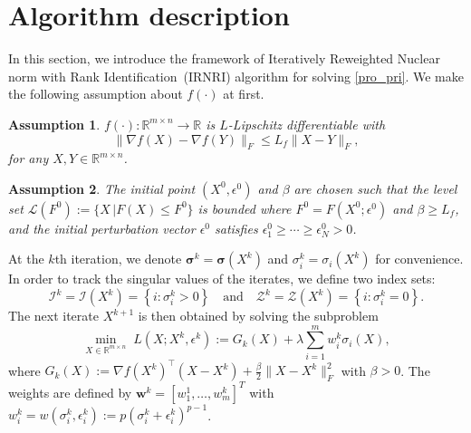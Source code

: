 \documentclass[twoside,11pt]{article}
\newtheorem{ASM}{Assumption}
\numberwithin{equation}{section}
\begin{document}
\section{Algorithm description}
In this section, we introduce the framework of Iteratively Reweighted Nuclear norm with Rank Identification~(IRNRI) algorithm for solving \eqref{pro_pri}. 
We make the following assumption about $f (\cdot)$ at first.
\begin{ASM}\label{ASM_fLip} $f (\cdot):\mathbb{R}^{m\times n}\to\mathbb{R} $ %
  is $L$-Lipschitz differentiable with
  \begin{equation*}
    \|\nabla f (X) - \nabla f (Y)\|_{F} \le L_{f}\|X-Y\|_{F},
  \end{equation*}
  for any $X,Y\in\mathbb{R}^{m\times n}$. %
\end{ASM}
\begin{ASM}\label{ASM_Flower} The initial point $ (X^{0},\epsilon^{0}) $ and $\beta$ are chosen such that the level set $\mathcal{L} (F^{0}):=\{X \,|F (X)\le F^{0} \} $ is bounded where $ F^{0} = F (X^{0};\epsilon^{0})$ and $\beta\ge{L}_{f}$, and the initial perturbation vector  $\epsilon^{0}$ satisfies $\epsilon_{1}^{0} \ge\cdots \ge \epsilon_{N}^{0} > 0$. 
\end{ASM} 

At the $k$th iteration, we denote $\bm{\sigma}^{k} = {\bm \sigma}(X^{k}) $ and $\sigma_i^k = \sigma_i(X^k)$ 
  for convenience.
In order to track the singular values of the iterates, we define two index sets:
\begin{equation*}
  \mathcal{I}^{k} = \mathcal{I} (X^{k}) = \left\{i:\sigma_i^k>0\right\} \quad\text{and}\quad 
  \mathcal{Z}^{k} = \mathcal{Z} (X^{k}) = \left\{i:\sigma_i^k=0\right\}. 
\end{equation*}   
The next iterate $X^{k+1}$ is then obtained by solving the subproblem 
\begin{equation}\label{pro_Linear}
  \min_{X\in\mathbb{R}^{m\times{n}}} \; L(X;X^{k},\epsilon^{k}):= G_{k} (X) + \lambda\sum\limits_{i=1}^{m}w_{i}^{k}\sigma_{i} (X),
\end{equation}
where $G_{k} (X):=\nabla f (X^{k})^{\top} (X-X^{k})+ \frac{\beta}{2}\| X-X^{k}\|_{F}^{2} $ with $\beta>0$.
The weights are  defined by $\bm{w}^{k} = [w_1^1, \ldots, w_m^k]^T$ with $w_{i}^{k}= w\left(\sigma_i^k ,\epsilon_{i}^{k}\right):= p \left(\sigma_i^k+\epsilon_{i}^{k} \right)^{p-1}$.  
\end{document}
